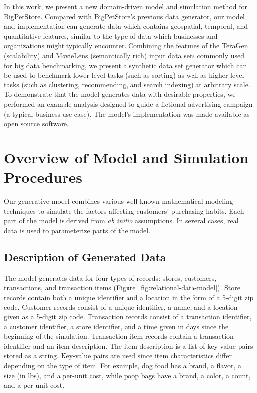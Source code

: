 In this work, we present a new domain-driven model and simulation method for BigPetStore.  Compared with BigPetStore's previous data generator, our model and implementation can generate data which contains geospatial, temporal, and quantitative features, similar to the type of data which businesses and organizations might typically encounter.  Combining the features of the TeraGen (scalability)  and MovieLens \cite{MovieLens} (semantically rich) input data sets commonly used for big data benchmarking, we present a synthetic data set generator which can be used to benchmark lower level tasks (such as sorting) as well as higher level tasks (such as clustering, recommending, and search indexing) at arbitrary scale.  To demonstrate that the model generates data with desirable properties, we performed an example analysis designed to guide a fictional advertising campaign (a typical business use case). The model's implementation was made available as open source software.

\section{Overview of Model and Simulation Procedures}
Our generative model combines various well-known mathematical modeling techniques to simulate the factors affecting customers' purchasing habits.  Each part of the model is derived from \emph{ab initio} assumptions.  In several cases, real data is used to parameterize parts of the model. 

\subsection{Description of Generated Data}
The model generates data for four types of records: stores, customers, transactions, and transaction items (Figure~\ref{fig:relational-data-model}).  Store records contain both a unique identifier and a location in the form of a 5-digit zip code. Customer records consist of a unique identifier, a name, and a location given as a 5-digit zip code. Transaction records consist of a transaction identifier, a customer identifier, a store identifier, and a time given in days since the beginning of the simulation. Transaction item records contain a transaction identifier and an item description.  The item description is a list of key-value pairs stored as a string.  Key-value pairs are used since item characteristics differ depending on the type of item.  For example, dog food has a brand, a flavor, a size (in lbs), and a per-unit cost, while poop bags have a brand, a color, a count, and a per-unit cost.


